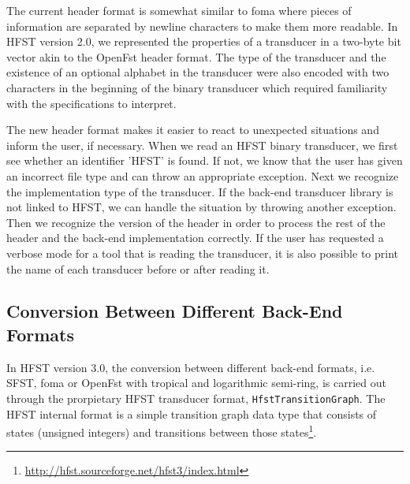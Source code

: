 \documentclass{llncs}
\begin{document}
The current header format is somewhat similar to foma where pieces of 
information are separated by newline characters to make them more
readable. In HFST version 2.0, we represented the properties of a
transducer in a two-byte bit vector akin to the OpenFst header
format. The type of the transducer and the existence of an optional
alphabet in the transducer were also encoded with two characters in the beginning of the
binary transducer which required familiarity with the specifications to interpret.


The new header format makes it easier to react to unexpected
situations and inform the user, if necessary. When we read an HFST
binary transducer, we first see whether an identifier 'HFST' is
found. If not, we know that the user has given an incorrect
file type and can throw an appropriate exception. 
Next we recognize the implementation type of the transducer. 
If the back-end transducer library is not linked to HFST, we can handle
the situation by throwing another exception. 
Then we recognize the version of the header in order to process 
the rest of the header and the back-end implementation correctly. 
If the user has requested a verbose mode for a tool that is reading the
transducer, it is also possible to print the name of each transducer 
before or after reading it.

\subsection{Conversion Between Different Back-End Formats}
In HFST version 3.0, the conversion between different back-end formats, i.e. 
SFST, foma or OpenFst with tropical and logarithmic semi-ring,  is
carried out through the prorpietary HFST transducer format, \texttt{HfstTransitionGraph}. 
The HFST internal format is a simple transition graph data type that consists 
of states (unsigned integers) and transitions between those 
states\footnote{\url{http://hfst.sourceforge.net/hfst3/index.html}}.
 
\end{document}

